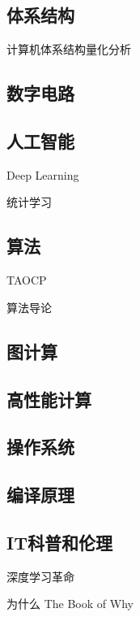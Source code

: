 \subsection{体系结构}

计算机体系结构量化分析


\subsection{数字电路}


\subsection{人工智能}

Deep Learning

统计学习


\subsection{算法}

TAOCP 

算法导论

\subsection{图计算}


\subsection{高性能计算}


\subsection{操作系统 }


\subsection{编译原理}


\subsection{}

\subsection{IT科普和伦理}

深度学习革命

为什么  The Book of Why

